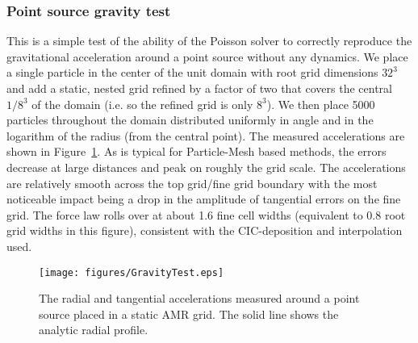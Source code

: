 \subsubsection{Point source gravity test}
\label{sec.test.gravitypointsource}

This is a simple test of the ability of the Poisson solver to
correctly reproduce the gravitational acceleration around a point
source without any dynamics.  We place a single particle in the center
of the unit domain with root grid dimensions $32^3$ and add a static,
nested grid refined by a factor of two that covers the central $1/8^3$
of the domain (i.e. so the refined grid is only $8^3$).  We then place
5000 particles throughout the domain distributed uniformly in angle
and in the logarithm of the radius (from the central point).  The
measured accelerations are shown in Figure~\ref{fig.gravitytest}.  As
is typical for Particle-Mesh based methods, the errors decrease at
large distances and peak on roughly the grid scale.  The accelerations
are relatively smooth across the top grid/fine grid boundary with the
most noticeable impact being a drop in the amplitude of tangential
errors on the fine grid.  The force law rolls over at about 1.6 fine
cell widths (equivalent to 0.8 root grid widths in this figure),
consistent with the CIC-deposition and interpolation used.

\begin{figure}
\begin{center}
\texttt{[image: figures/GravityTest.eps]}
\caption{The radial and tangential accelerations measured around a
  point source placed in a static AMR grid.  The solid line shows the
  analytic radial profile.}
\label{fig.gravitytest}
\end{center}
\end{figure}
